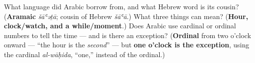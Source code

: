 \begin{tcolorbox}[breakable,colback=teal!4,colframe=teal!35!black,title={Before you move on}]
What language did Arabic borrow \textbf{} from, and what Hebrew word is its cousin? (\textbf{Aramaic} \emph{šāʿəṯā}; cousin of Hebrew \emph{šāʿā}.) What three things can \textbf{} mean? (\textbf{Hour, clock/watch, and a while/moment}.) Does Arabic use cardinal or ordinal numbers to tell the time — and is there an exception? (\textbf{Ordinal} from two o'clock onward — \textquotedblleft{}the hour is the \emph{second}\textquotedblright{} — but \textbf{one o'clock is the exception}, using the cardinal \emph{al-wāḥida}, \textquotedblleft{}one,\textquotedblright{} instead of the ordinal.)
\end{tcolorbox}
